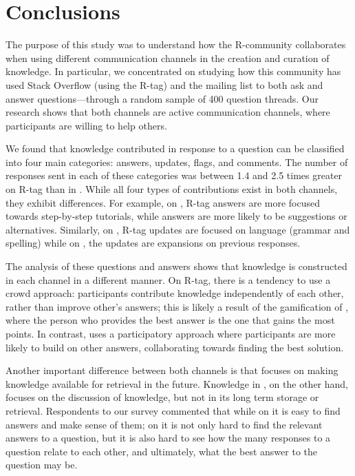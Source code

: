 \section{Conclusions}
\label{cha:conclusion}

The purpose of this study was to understand how the R-community collaborates when using different communication channels in the creation and curation of knowledge.
In particular, we concentrated on studying how this community has used Stack Overflow (using the R-tag) and the \RH mailing list to both ask and answer questions---through a random sample of 400 question threads. Our research shows that both channels are active communication channels, where participants are willing to help others. 

We found that knowledge contributed in response to a question can be classified into four main categories: answers, updates, flags, and comments. The number of
responses sent in each of these categories was between 1.4 and 2.5 times greater on \SO R-tag than in \RH. While all four types of contributions exist in both
channels, they exhibit differences. For example, on \SO, R-tag answers are more focused towards step-by-step tutorials, while \RH answers are more
likely to be suggestions or alternatives. Similarly, on \SO, R-tag updates are focused on language (grammar and spelling) while on \RH, the updates are
expansions on previous responses.

The analysis of these questions and answers shows that knowledge is constructed in each channel in a different manner. On \SO R-tag, there is a tendency to use
a crowd approach: participants contribute knowledge independently of each other, rather than improve other's answers; this is likely a result of the
gamification of \SO, where the person who provides the best answer is the one that gains the most points.
In contrast, \RH uses a participatory approach where participants are more likely to build on other answers, collaborating towards finding the best solution.

Another important difference between both channels is that \SO focuses on making knowledge available for retrieval in the future. Knowledge in \RH, on the
other hand, focuses on the discussion of knowledge, but not in its long term storage or retrieval. Respondents to our survey commented that while on \SO it is easy to find answers
and make sense of them; on \RH it is not only hard to find the relevant answers to a question, but it is also hard to see how the many responses to a question
relate to each other, and ultimately, what the best answer to the question may be.

